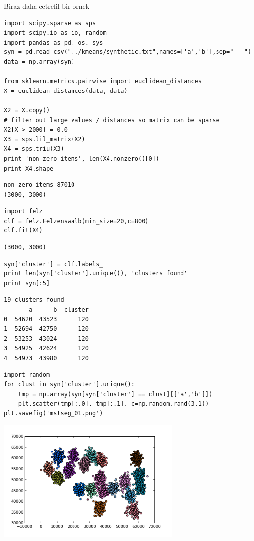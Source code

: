 \documentclass[12pt,fleqn]{article}\usepackage{../common}
\begin{document}
Biraz daha cetrefil bir ornek

\begin{verbatim}
import scipy.sparse as sps
import scipy.io as io, random
import pandas as pd, os, sys
syn = pd.read_csv("../kmeans/synthetic.txt",names=['a','b'],sep="   ")
data = np.array(syn)

from sklearn.metrics.pairwise import euclidean_distances
X = euclidean_distances(data, data)

X2 = X.copy()
# filter out large values / distances so matrix can be sparse
X2[X > 2000] = 0.0
X3 = sps.lil_matrix(X2)
X4 = sps.triu(X3)
print 'non-zero items', len(X4.nonzero()[0])
print X4.shape
\end{verbatim}

\begin{verbatim}
non-zero items 87010
(3000, 3000)
\end{verbatim}

\begin{verbatim}
import felz
clf = felz.Felzenswalb(min_size=20,c=800)
clf.fit(X4)
\end{verbatim}

\begin{verbatim}
(3000, 3000)
\end{verbatim}

\begin{verbatim}
syn['cluster'] = clf.labels_
print len(syn['cluster'].unique()), 'clusters found'
print syn[:5]
\end{verbatim}

\begin{verbatim}
19 clusters found
       a      b  cluster
0  54620  43523      120
1  52694  42750      120
2  53253  43024      120
3  54925  42624      120
4  54973  43980      120
\end{verbatim}

\begin{verbatim}
import random
for clust in syn['cluster'].unique():
    tmp = np.array(syn[syn['cluster'] == clust][['a','b']])
    plt.scatter(tmp[:,0], tmp[:,1], c=np.random.rand(3,1))
plt.savefig('mstseg_01.png')
\end{verbatim}

\includegraphics[height=6cm]{mstseg_01.png}
\end{document}
